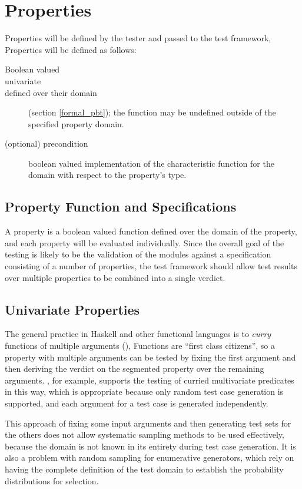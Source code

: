 \section {Properties} \label{reqprop}

Properties will be defined by the tester and passed to the test framework,
Properties will be defined as follows:

\begin{description}
\item[Boolean valued]
\item[univariate] 
\item[defined over their domain]  (section \ref{formal_pbt});
the function may be undefined outside of the specified property domain.
\item[(optional) precondition] boolean valued implementation of the characteristic function for the domain with respect to the property's type.
\end{description}


\subsection{Property Function and Specifications}
A property is a boolean valued function
defined over the domain of the property,
and each property will be evaluated individually.
Since the overall goal of the testing is 
likely to be the validation of the modules against a 
specification consisting of a number of properties,
the test framework should allow test results
over multiple properties to be combined into a single verdict.

\subsection{Univariate Properties}
The general practice in Haskell and other functional languages
is to \emph{curry} functions of multiple arguments (\cite{Haskell2010}),
Functions are ``first class citizens'',
so a property with multiple arguments
can be tested by fixing the first argument and 
then deriving the verdict on the segmented property over the remaining arguments.
\QC, for example, supports the testing of curried multivariate predicates in this way,
which is appropriate because only random test case generation is supported,
and each argument for a test case is generated independently.

This approach of fixing some input arguments and then generating test sets for the others
does not allow systematic sampling methods to be used effectively,
because the domain is not known in its entirety during test case generation.
It is also a problem with random sampling for enumerative generators,
which rely on having the complete definition of the test domain to
establish the probability distributions for selection.


